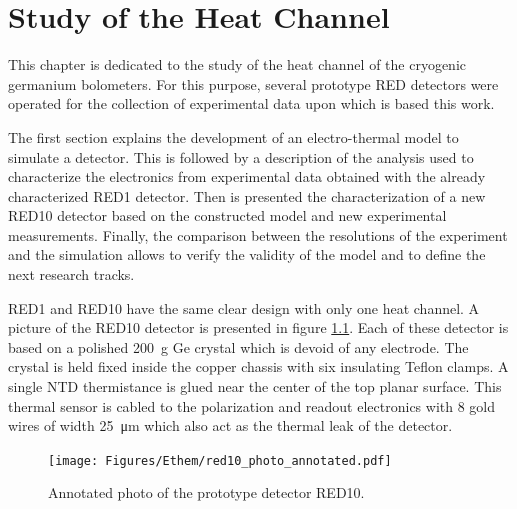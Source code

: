 
\chapter{Study of the Heat Channel}

\label{ChapterEthem} %


This chapter is dedicated to the study of the heat channel of the cryogenic germanium bolometers. For this purpose, several prototype RED detectors were operated for the collection of experimental data upon which is based this work.

The first section explains the development of an electro-thermal model to simulate a detector. This is followed by a description of the analysis used to characterize the electronics from experimental data obtained with the already characterized RED1 detector. Then is presented the characterization of a new RED10 detector based on the constructed model and new experimental measurements. Finally, the comparison between the resolutions of the experiment and the simulation allows to verify the validity of the model and to define the next research tracks.

RED1 and RED10 have the same clear design with only one heat channel. A picture of the RED10 detector is presented in figure \ref{fig:red10-photo}.
Each of these detector is based on a polished \SI{200}{\g} Ge crystal which is devoid of any electrode. The crystal is held fixed inside the copper chassis with six insulating Teflon clamps. A single NTD thermistance is glued near the center of the top planar surface. This thermal sensor is cabled to the polarization and readout electronics with 8 gold wires of width \SI{25}{\micro\meter} which also act as the thermal leak of the detector.

\begin{figure}[!h]
\centering
\begin{center}
\texttt{[image: Figures/Ethem/red10\_photo\_annotated.pdf]}
\end{center}
\caption{Annotated photo of the prototype detector RED10.}
\label{fig:red10-photo}
\end{figure}

